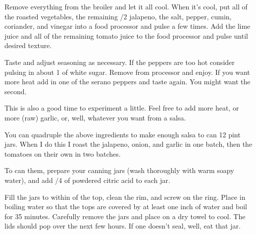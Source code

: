 \begin{IngredientsAndSteps}
{        Remove everything from the broiler and let it all cool. When it's cool,
        put all of the roasted vegetables, the remaining /2 jalapeno, the salt,
        pepper, cumin, coriander, and vinegar into a food processor and pulse a
        few times. Add the lime juice and all of the remaining tomato juice to the
        food processor and pulse until desired texture.

        Taste and adjust seasoning as necessary. If the peppers are too hot
        consider pulsing in about 1 \tsp of white sugar. Remove from processor
        and enjoy. If you want more heat add in one of the serano peppers and taste
        again. You might want the second.

        This is also a good time to experiment a little. Feel free to add more heat,
        or more (raw) garlic, or, well, whatever you want from a salsa.
    }
\end{IngredientsAndSteps}

\begin{ChefNotes}
    {You can quadruple the above ingredients to make enough salsa to can 12 pint
        jars. When I do this I roast the jalapeno, onion, and garlic in one batch,
        then the tomatoes on their own in two batches.

        To can them, prepare your canning jars (wash thoroughly with warm soapy
        water), and add /4 \tsp of powdered citric acid to each jar.

        Fill the jars to within  of the top, clean the rim, and screw
        on the ring. Place in boiling water so that the tops are covered by at
        least one inch of water and boil for 35 minutes. Carefully remove the
        jars and place on a dry towel to cool. The lids should pop over the next
        few hours. If one doesn't seal, well, eat that jar.}
\end{ChefNotes}